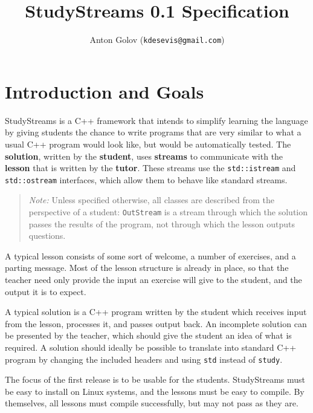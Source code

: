 \documentclass[12pt,a4paper]{report}
\title{StudyStreams 0.1 Specification}
\author{Anton Golov (\texttt{kdesevis@gmail.com})}
\begin{document}
	\maketitle{}
	\tableofcontents{}
	\chapter{Introduction and Goals}
		StudyStreams is a C++ framework that intends to simplify learning
		the language by giving students the chance to write programs that
		are very similar to what a usual C++ program would look like, but
		would be automatically tested.  The \textbf{solution}, written by
		the \textbf{student}, uses \textbf{streams} to communicate with
		the \textbf{lesson} that is written by the \textbf{tutor}.  These
		streams use the \texttt{std::istream} and \texttt{std::ostream}
		interfaces, which allow them to behave like standard streams.
		
		\begin{quote}
			\emph{Note:} Unless specified otherwise, all classes are
			described from the perspective of a student:  \texttt{OutStream}
			is a stream through which the solution passes the results of the
			program, not through which the lesson outputs questions.
		\end{quote}

		A typical lesson consists of some sort of welcome, a number of
		exercises, and a parting message.  Most of the lesson structure is
		already in place, so that the teacher need only provide the input
		an exercise will give to the student, and the output it is to
		expect.

		A typical solution is a C++ program written by the student which
		receives input from the lesson, processes it, and passes output
		back.  An incomplete solution can be presented by the teacher,
		which should give the student an idea of what is required.  A
		solution should ideally be possible to translate into standard
		C++ program by changing the included headers and using \texttt{std}
		instead of \texttt{study}.

		The focus of the first release is to be usable for the students.
		StudyStreams must be easy to install on Linux systems, and the
		lessons must be easy to compile.  By themselves, all lessons must
		compile successfully, but may not pass as they are.
\end{document}
